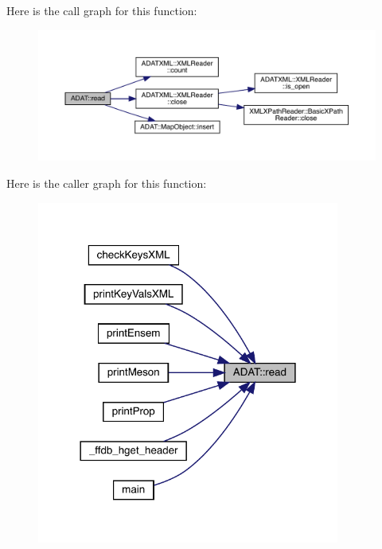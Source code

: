 Here is the call graph for this function\+:\nopagebreak
\begin{figure}[H]
\begin{center}
\leavevmode
\includegraphics[width=350pt]{d5/d0d/namespaceADAT_ab1cb4aab951dd138f8f0a73f5c3ead6d_cgraph}
\end{center}
\end{figure}
Here is the caller graph for this function\+:
\nopagebreak
\begin{figure}[H]
\begin{center}
\leavevmode
\includegraphics[width=282pt]{d5/d0d/namespaceADAT_ab1cb4aab951dd138f8f0a73f5c3ead6d_icgraph}
\end{center}
\end{figure}
\mbox{\label{namespaceADAT_a38920c20e5e4ccb234f9a05e436a4faa}} 
